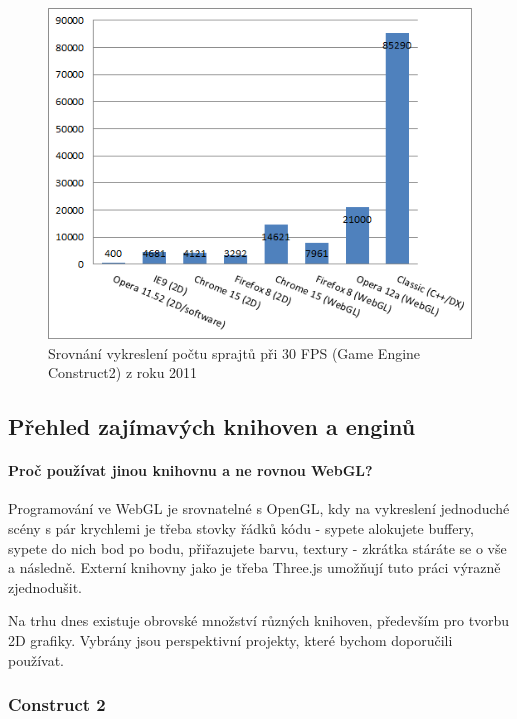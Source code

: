\documentclass[12pt,a4paper,titlepage,final]{report}
\begin{document}
\begin{figure}[ht]
\begin{center}

\includegraphics[width=12cm]{images/allperf-graph.png}
\caption{Srovnání vykreslení počtu sprajtů při 30 FPS (Game Engine Construct2) z roku 2011}
\label{fig:theory}
\end{center}
\end{figure}

\newpage

\subsection{Přehled zajímavých knihoven a enginů}

\paragraph{Proč používat jinou knihovnu a ne rovnou WebGL?} Programování ve WebGL je srovnatelné s OpenGL, kdy na vykreslení jednoduché scény s pár krychlemi je třeba stovky řádků kódu - sypete alokujete buffery, sypete do nich bod po bodu, přiřazujete barvu, textury - zkrátka stáráte se o vše a následně. Externí knihovny jako je třeba Three.js umožňují tuto práci výrazně zjednodušit.

Na trhu dnes existuje obrovské množství různých knihoven, především pro tvorbu 2D grafiky. Vybrány jsou perspektivní projekty, které bychom doporučili používat.

\subsubsection{Construct 2}
\end{document}
